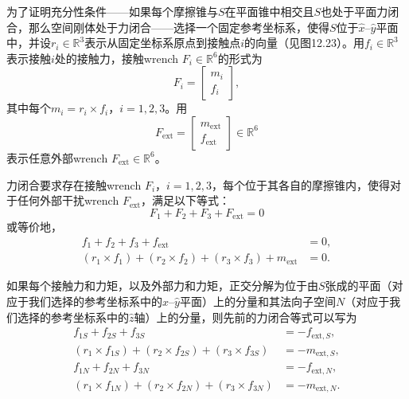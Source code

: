\documentclass[12pt,a4paper]{article}
\begin{document}
为了证明充分性条件——如果每个摩擦锥与$S$在平面锥中相交且$S$也处于平面力闭合，那么空间刚体处于力闭合——选择一个固定参考坐标系，使得$S$位于$\hat{x}$–$\hat{y}$平面中，并设$r_i \in \mathbb{R}^3$表示从固定坐标系原点到接触点$i$的向量（见图12.23）。用$f_i \in \mathbb{R}^3$表示接触$i$处的接触力，接触wrench $F_i \in \mathbb{R}^6$的形式为
\begin{equation}
F_i = \begin{bmatrix} m_i \\ f_i \end{bmatrix},
\label{eq:12.17}
\end{equation}
其中每个$m_i = r_i \times f_i$，$i = 1, 2, 3$。用
\begin{equation}
F_{\text{ext}} = \begin{bmatrix} m_{\text{ext}} \\ f_{\text{ext}} \end{bmatrix} \in \mathbb{R}^6
\label{eq:12.18}
\end{equation}
表示任意外部wrench $F_{\text{ext}} \in \mathbb{R}^6$。

力闭合要求存在接触wrench $F_i$，$i = 1, 2, 3$，每个位于其各自的摩擦锥内，使得对于任何外部干扰wrench $F_{\text{ext}}$，满足以下等式：
\begin{equation}
F_1 + F_2 + F_3 + F_{\text{ext}} = 0
\label{eq:12.19}
\end{equation}
或等价地，
\begin{align}
f_1 + f_2 + f_3 + f_{\text{ext}} &= 0, \label{eq:12.20} \\
(r_1 \times f_1) + (r_2 \times f_2) + (r_3 \times f_3) + m_{\text{ext}} &= 0. \label{eq:12.21}
\end{align}

如果每个接触力和力矩，以及外部力和力矩，正交分解为位于由$S$张成的平面（对应于我们选择的参考坐标系中的$\hat{x}$–$\hat{y}$平面）上的分量和其法向子空间$N$（对应于我们选择的参考坐标系中的$\hat{z}$轴）上的分量，则先前的力闭合等式可以写为
\begin{align}
f_{1S} + f_{2S} + f_{3S} &= -f_{\text{ext},S}, \label{eq:12.22} \\
(r_1 \times f_{1S}) + (r_2 \times f_{2S}) + (r_3 \times f_{3S}) &= -m_{\text{ext},S}, \label{eq:12.23} \\
f_{1N} + f_{2N} + f_{3N} &= -f_{\text{ext},N}, \label{eq:12.24} \\
(r_1 \times f_{1N}) + (r_2 \times f_{2N}) + (r_3 \times f_{3N}) &= -m_{\text{ext},N}. \label{eq:12.25}
\end{align}
\end{document}
